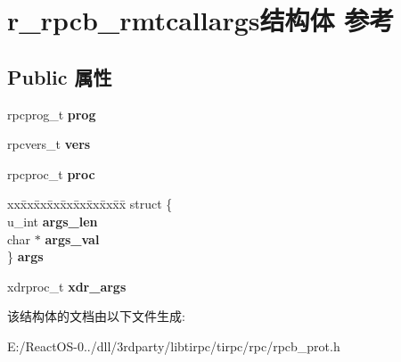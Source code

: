 \hypertarget{structr__rpcb__rmtcallargs}{}\section{r\+\_\+rpcb\+\_\+rmtcallargs结构体 参考}
\label{structr__rpcb__rmtcallargs}
\subsection*{Public 属性}
\begin{DoxyCompactItemize}
\item 
\mbox{\label{structr__rpcb__rmtcallargs_a596a82884b9a4042e84b1aabeec12f61}} 
rpcprog\+\_\+t {\bfseries prog}
\item 
\mbox{\label{structr__rpcb__rmtcallargs_abe676703eff86c9ccaf1890e5322f8d5}} 
rpcvers\+\_\+t {\bfseries vers}
\item 
\mbox{\label{structr__rpcb__rmtcallargs_ac98c5a9f8211cb0bcd21c99ec27fbe70}} 
rpcproc\+\_\+t {\bfseries proc}
\item 
\mbox{\label{structr__rpcb__rmtcallargs_a5278e17188683293045d8dda2f4601e8}} 
\begin{tabbing}
xx\=xx\=xx\=xx\=xx\=xx\=xx\=xx\=xx\=\kill
struct \{\\
\>u\_int {\bfseries args\_len}\\
\>char $\ast$ {\bfseries args\_val}\\
\} {\bfseries args}\\

\end{tabbing}\item 
\mbox{\label{structr__rpcb__rmtcallargs_a44904c237c492d7cc47aba5c331aab18}} 
xdrproc\+\_\+t {\bfseries xdr\+\_\+args}
\end{DoxyCompactItemize}


该结构体的文档由以下文件生成\+:\begin{DoxyCompactItemize}
\item 
E\+:/\+React\+O\+S-\/0../dll/3rdparty/libtirpc/tirpc/rpc/rpcb\+\_\+prot.\+h\end{DoxyCompactItemize}
